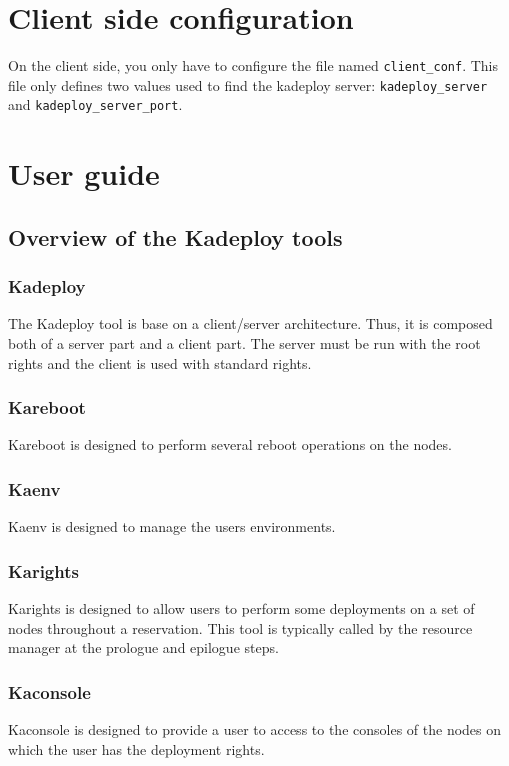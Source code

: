 \documentclass[a4wide,10pt,oneside]{book}
\begin{document}
\chapter{Client side configuration}
On the client side, you only have to configure the file named \texttt{client\_conf}. This file only defines two values used to find the kadeploy server: \texttt{kadeploy\_server} and \texttt{kadeploy\_server\_port}.

\chapter{User guide}

\section{Overview of the Kadeploy tools}
\subsection{Kadeploy}
The Kadeploy tool is base on a client/server architecture. Thus, it is composed both of a server part and a client part. The server must be run with the root rights and the client is used with standard rights.

\subsection{Kareboot}
Kareboot is designed to perform several reboot operations on the nodes.

\subsection{Kaenv}
Kaenv is designed to manage the users environments.

\subsection{Karights}
Karights is designed to allow users to perform some deployments on a set of nodes throughout a reservation. This tool is typically called by the resource manager at the prologue and epilogue steps.

\subsection{Kaconsole}
Kaconsole is designed to provide a user to access to the consoles of the nodes on which the user has the deployment rights.
\end{document}
